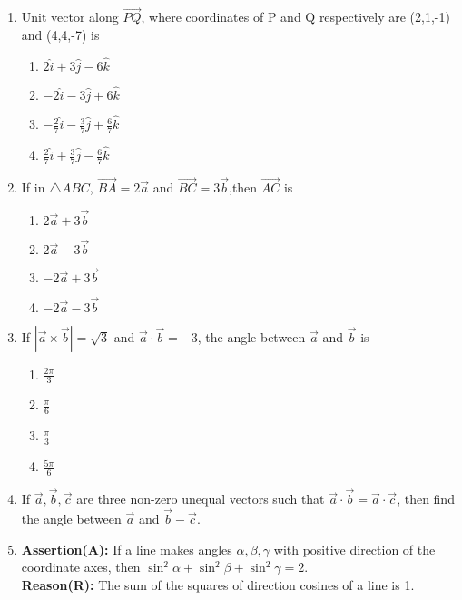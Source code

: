 \begin{enumerate}
\item Unit vector along $\overrightarrow{PQ}$, where coordinates of P and Q respectively are (2,1,-1) and (4,4,-7) is
\begin{enumerate}
\item $ 2\hat i+3\hat j-6\hat k $
\item $ -2\hat i-3\hat j+6\hat k $
\item $ -\frac{2}{7}\hat i-\frac{3}{7}\hat j+\frac{6}{7}\hat k $
\item $ \frac{2}{7}\hat i+\frac{3}{7}\hat j-\frac{6}{7}\hat k $
\end{enumerate}
\item If in $\triangle ABC$, $\overrightarrow{BA}=2\vec a$ and $\overrightarrow{BC}=3\vec b$,then $\overrightarrow{AC}$ is
\begin{enumerate}
\item $ 2\vec a+3\vec b $
\item $ 2\vec a-3\vec b $
\item $  -2\vec a+3\vec b $
\item $  -2\vec a-3\vec b $
\end{enumerate}
\item If $|\vec a \times \vec b|=\sqrt{3} $ and $\vec a \cdot \vec b =-3$, the angle between $\vec a$ and $\vec b$ is
\begin{enumerate}
\item $ \frac{2\pi}{3} $
\item $  \frac{\pi}{6} $
\item $  \frac{\pi}{3} $
\item $ \frac{5\pi}{6} $
\end{enumerate}
\item If $\vec a, \vec b, \vec c$ are three non-zero unequal vectors such that $\vec a \cdot \vec b =\vec a \cdot \vec c$, then find the angle between $\vec a$ and $\vec b - \vec c$.
     \item \textbf{Assertion(A):} If a line makes angles $\alpha, \beta, \gamma$ with positive direction of the coordinate axes, then $\sin^2 \alpha + \sin^2 \beta + \sin^2 \gamma = 2$.\\
\textbf{Reason(R):} The sum of the squares of direction cosines of a line is 1.
\end{enumerate}


